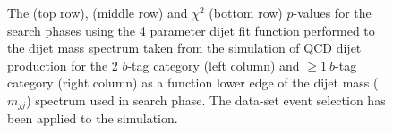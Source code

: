 \begin{figure}[!htb]
\begin{center}
  \end{center}
  \caption{The \bh{} (top row),  \dhunt{} (middle row) and $\chi^{2}$ (bottom row) \mbox{$p$-value}s
    for the search phases using the 4 parameter dijet fit function
    performed to the dijet mass spectrum taken from the simulation of QCD dijet production
    for the 2 $b$-tag category (left column) and $\geq1~b$-tag category (right column)
    as a function lower edge of the dijet mass ($m_{jj}$) spectrum used in search phase.
    The \summer{} data-set event selection has been applied to the simulation.}
  \label{fig:mjjGraphs}
\end{figure}

